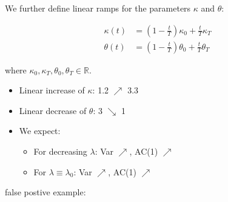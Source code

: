 \documentclass[%
thesis=student,%
coverpage=false,%
titlepage=false,%
headmarks=true, %
german,%
font=libertine, %
math=newpxtx, %
BCOR=5mm,%
coverBCOR=11mm%
]{tumbook}
\begin{document}
We further define linear ramps for the parameters $\kappa$ and $\theta$:

\begin{subequations}
    \begin{align*}
        \kappa(t) &= (1-\frac{t}{T})\kappa_{0} + \frac{t}{T}\kappa_{T} \\
        \theta(t) &= (1-\frac{t}{T})\theta_{0} + \frac{t}{T}\theta_{T}
    \end{align*}
\end{subequations}

where $\kappa_{0},\kappa_{T},\theta_{0},\theta_{T} \in \mathbb{R}$.

\begin{itemize}
    \item Linear increase of $\kappa$: 1.2 $\nearrow$ 3.3 
    \item Linear decrease of $\theta$: 3 $\searrow$ 1
    \item We expect: 
    \begin{itemize}
        \item For decreasing $\lambda$: Var $\nearrow$, AC(1) $\nearrow$
        \item For $\lambda \equiv \lambda_{0}$: Var $\nearrow$, AC(1) $\nearrow$
    \end{itemize}
\end{itemize}

false postive example:
\end{document}
